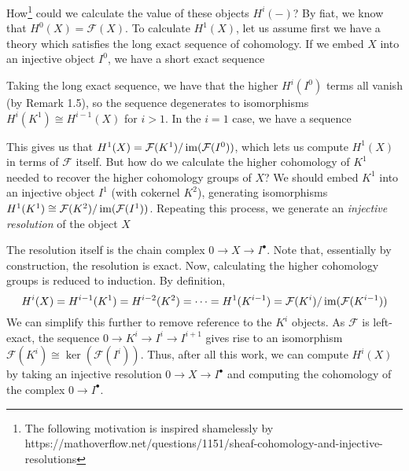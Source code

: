 How\footnote{The following motivation is inspired shamelessly by https://mathoverflow.net/questions/1151/sheaf-cohomology-and-injective-resolutions} could we calculate the value of these objects $H^i({-})$? By fiat, we know that $H^0(X) = \mathcal{F}(X)$. To calculate $H^1(X)$, let us assume first we have a theory which satisfies the long exact sequence of cohomology. If we embed $X$ into an injective object $I^0$, we have a short exact sequence
\begin{center}
\end{center}
Taking the long exact sequence, we have that the higher $H^i(I^0)$ terms all vanish (by Remark 1.5), so the sequence degenerates to isomorphisms $H^i(K^1) \cong H^{i-1}(X)$ for $i > 1$. In the $i=1$ case, we have a sequence
\begin{center}
\end{center}
This gives us that $H^1(X) = \mathcal{F}(K^1) / \operatorname{im}(\mathcal{F}(I^0))$, which lets us compute $H^1(X)$ in terms of $\mathcal{F}$ itself. But how do we calculate the higher cohomology of $K^1$ needed to recover the higher cohomology groups of $X$? We should embed $K^1$ into an injective object $I^1$ (with cokernel $K^2$), generating isomorphisms $H^1(K^1) \cong \mathcal{F}(K^2) / \operatorname{im}(\mathcal{F}(I^1))$. Repeating this process, we generate an \textit{injective resolution} of the object $X$
\begin{center}
\end{center}
The resolution itself is the chain complex $0 \to X \to I^\bullet$. Note that, essentially by construction, the resolution is exact. Now, calculating the higher cohomology groups is reduced to induction. By definition,
\[
    H^i(X) = H^{i-1}(K^1) = H^{i-2}(K^2) = \cdots = H^1(K^{i-1}) = \mathcal{F}(K^i) / \operatorname{im}(\mathcal{F}(K^{i-1}))
\]
We can simplify this further to remove reference to the $K^i$ objects. As $\mathcal{F}$ is left-exact, the sequence $0 \to K^i \to I^i \to I^{i+1}$ gives rise to an isomorphism $\mathcal{F}(K^i) \cong \ker(\mathcal{F}(I^i))$. Thus, after all this work, we can compute $H^i(X)$ by taking an injective resolution $0 \to X \to I^\bullet$ and computing the cohomology of the complex $0 \to I^\bullet$.

